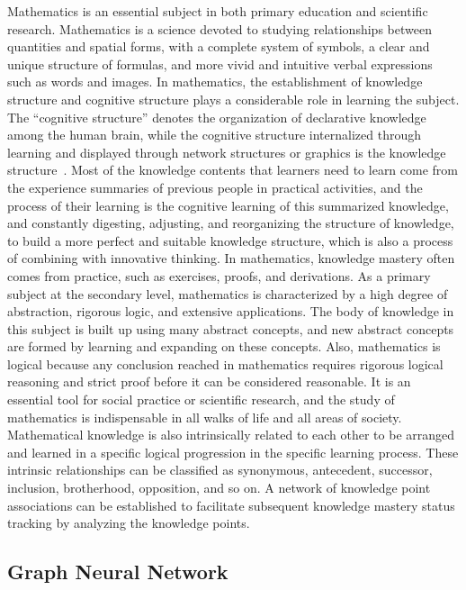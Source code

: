 Mathematics is an essential subject in both primary education and scientific research. Mathematics is a science devoted to studying relationships between quantities and spatial forms, with a complete system of symbols, a clear and unique structure of formulas, and more vivid and intuitive verbal expressions such as words and images. In mathematics, the establishment of knowledge structure and cognitive structure plays a considerable role in learning the subject. The ``cognitive structure'' denotes the organization of declarative knowledge among the human brain, while the cognitive structure internalized through learning and displayed through network structures or graphics is the knowledge structure~\cite{tanujaya2017relationship}. Most of the knowledge contents that learners need to learn come from the experience summaries of previous people in practical activities, and the process of their learning is the cognitive learning of this summarized knowledge, and constantly digesting, adjusting, and reorganizing the structure of knowledge, to build a more perfect and suitable knowledge structure, which is also a process of combining with innovative thinking. In mathematics, knowledge mastery often comes from practice, such as exercises, proofs, and derivations. As a primary subject at the secondary level, mathematics is characterized by a high degree of abstraction, rigorous logic, and extensive applications. The body of knowledge in this subject is built up using many abstract concepts, and new abstract concepts are formed by learning and expanding on these concepts. Also, mathematics is logical because any conclusion reached in mathematics requires rigorous logical reasoning and strict proof before it can be considered reasonable. It is an essential tool for social practice or scientific research, and the study of mathematics is indispensable in all walks of life and all areas of society. Mathematical knowledge is also intrinsically related to each other to be arranged and learned in a specific logical progression in the specific learning process. These intrinsic relationships can be classified as synonymous, antecedent, successor, inclusion, brotherhood, opposition, and so on. A network of knowledge point associations can be established to facilitate subsequent knowledge mastery status tracking by analyzing the knowledge points.

\subsection{Graph Neural Network}

